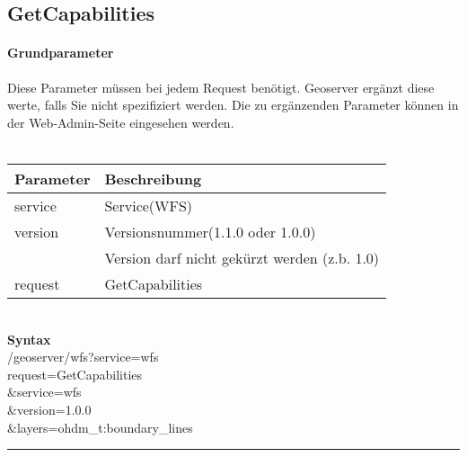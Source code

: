 \documentclass[12pt]{article}
\begin{document}
\subsection{GetCapabilities}
\paragraph{Grundparameter} Diese Parameter müssen bei jedem Request benötigt. Geoserver ergänzt diese werte, falls Sie nicht spezifiziert werden. Die zu ergänzenden Parameter können in der Web-Admin-Seite eingesehen werden.\\
\vspace{2em}\\
\begin{tabular}{ll}
\textbf{Parameter} & \textbf{Beschreibung}\\
\hline 
service  & Service(WFS) \\ 
\hline 
version  & Versionsnummer(1.1.0 oder 1.0.0) \\&Version darf nicht gekürzt werden (z.b. 1.0)\\ 
\hline 
request  & GetCapabilities \\ 
\hline 
\end{tabular}\\


\textbf{Syntax}\\
/geoserver/wfs?service=wfs\\
request=GetCapabilities\\
\&service=wfs\\
\&version=1.0.0\\
\&layers=ohdm\_t:boundary\_lines\\

\hrule
\end{document}
